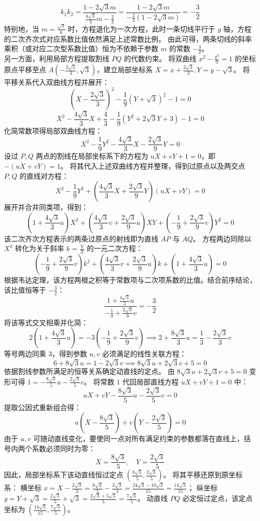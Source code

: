 \begin{solution}
$$ k_1 k_2 = \frac{1 - 2\sqrt{3}m}{\frac{4\sqrt{3}}{3}m - \frac{2}{3}} = \frac{1 - 2\sqrt{3}m}{-\frac{2}{3}(1 - 2\sqrt{3}m)} = -\frac{3}{2} $$
特别地，当 $m = \frac{\sqrt{3}}{6}$ 时，方程退化为一次方程，此时一条切线平行于 $y$ 轴，方程的二次齐次式对应系数比值依然满足上述常数比例。
由此可得，两条切线的斜率乘积（或对应二次型系数比值）恒为不依赖于参数 $m$ 的常数 $-\frac{3}{2}$。\\
另一方面，利用局部方程提取割线 $PQ$ 的代数约束。
将双曲线 $x^2 - \frac{y^2}{9} = 1$ 的坐标原点平移至点 $A\left(-\frac{2\sqrt{3}}{3}, \sqrt{3}\right)$，建立局部坐标系 $X = x + \frac{2\sqrt{3}}{3}, Y = y - \sqrt{3}$。
将平移关系代入双曲线方程并展开：
$$ \left(X - \frac{2\sqrt{3}}{3}\right)^2 - \frac{1}{9}(Y + \sqrt{3})^2 - 1 = 0 $$
$$ X^2 - \frac{4\sqrt{3}}{3}X + \frac{4}{3} - \frac{1}{9}(Y^2 + 2\sqrt{3}Y + 3) - 1 = 0 $$
化简常数项得局部双曲线方程：
$$ X^2 - \frac{1}{9}Y^2 - \frac{4\sqrt{3}}{3}X - \frac{2\sqrt{3}}{9}Y = 0 $$
设过 $P, Q$ 两点的割线在局部坐标系下的方程为 $uX + vY + 1 = 0$，即 $-(uX + vY) = 1$。
将其代入上述双曲线方程并整理，得到过原点以及两交点 $P, Q$ 的直线对方程：
$$ X^2 - \frac{1}{9}Y^2 + \left(\frac{4\sqrt{3}}{3}X + \frac{2\sqrt{3}}{9}Y\right)(uX + vY) = 0 $$
展开并合并同类项，得到：
$$ \left(1 + \frac{4\sqrt{3}}{3}u\right)X^2 + \left(\frac{4\sqrt{3}}{3}v + \frac{2\sqrt{3}}{9}u\right)XY + \left(-\frac{1}{9} + \frac{2\sqrt{3}}{9}v\right)Y^2 = 0 $$
该二次齐次方程表示的两条过原点的射线即为直线 $AP$ 与 $AQ$。
方程两边同除以 $X^2$ 转化为关于斜率 $k = \frac{Y}{X}$ 的一元二次方程：
$$ \left(-\frac{1}{9} + \frac{2\sqrt{3}}{9}v\right)k^2 + \left(\frac{4\sqrt{3}}{3}v + \frac{2\sqrt{3}}{9}u\right)k + \left(1 + \frac{4\sqrt{3}}{3}u\right) = 0 $$
根据韦达定理，该方程两根之积等于常数项与二次项系数的比值。结合前序结论，该比值恒等于 $-\frac{3}{2}$：
$$ \frac{1 + \frac{4\sqrt{3}}{3}u}{-\frac{1}{9} + \frac{2\sqrt{3}}{9}v} = -\frac{3}{2} $$
将该等式交叉相乘并化简：
$$ 2\left(1 + \frac{4\sqrt{3}}{3}u\right) = -3\left(-\frac{1}{9} + \frac{2\sqrt{3}}{9}v\right) \implies 2 + \frac{8\sqrt{3}}{3}u = \frac{1}{3} - \frac{2\sqrt{3}}{3}v $$
等号两边同乘 $3$，得到参数 $u, v$ 必须满足的线性关联方程：
$$ 6 + 8\sqrt{3}u = 1 - 2\sqrt{3}v \implies 8\sqrt{3}u + 2\sqrt{3}v + 5 = 0 $$
依据割线参数所满足的恒等关系确定动直线的定点。
由 $8\sqrt{3}u + 2\sqrt{3}v + 5 = 0$ 变形可得 $1 = -\frac{8\sqrt{3}}{5}u - \frac{2\sqrt{3}}{5}v$。
将常数 $1$ 代回局部直线方程 $uX + vY + 1 = 0$ 中：
$$ uX + vY - \frac{8\sqrt{3}}{5}u - \frac{2\sqrt{3}}{5}v = 0 $$
提取公因式重新组合得：
$$ u\left(X - \frac{8\sqrt{3}}{5}\right) + v\left(Y - \frac{2\sqrt{3}}{5}\right) = 0 $$
由于 $u,v$ 可随动直线变化，要使同一点对所有满足约束的参数都落在直线上，括号内两个系数必须同时为零：
$$ X = \frac{8\sqrt{3}}{5}, \quad Y = \frac{2\sqrt{3}}{5} $$
因此，局部坐标系下该动直线恒过定点 $\left(\frac{8\sqrt{3}}{5}, \frac{2\sqrt{3}}{5}\right)$。
将其平移还原到原坐标系：
横坐标 $x = X - \frac{2\sqrt{3}}{3} = \frac{8\sqrt{3}}{5} - \frac{2\sqrt{3}}{3} = \frac{24\sqrt{3} - 10\sqrt{3}}{15} = \frac{14\sqrt{3}}{15}$；
纵坐标 $y = Y + \sqrt{3} = \frac{2\sqrt{3}}{5} + \sqrt{3} = \frac{2\sqrt{3} + 5\sqrt{3}}{5} = \frac{7\sqrt{3}}{5}$。
动直线 $PQ$ 必定恒过定点，该定点坐标为 $\left(\frac{14\sqrt{3}}{15}, \frac{7\sqrt{3}}{5}\right)$。
\end{solution}




